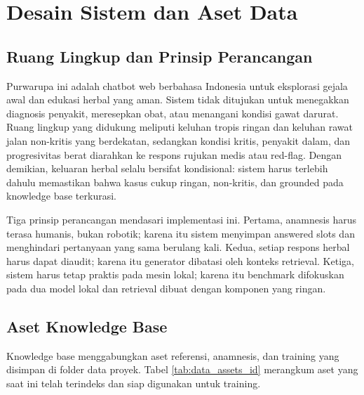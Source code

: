 \documentclass[conference]{IEEEtran}
\begin{document}
\section{Desain Sistem dan Aset Data}
\subsection{Ruang Lingkup dan Prinsip Perancangan}
Purwarupa ini adalah chatbot web berbahasa Indonesia untuk eksplorasi gejala awal dan edukasi herbal yang aman. Sistem tidak ditujukan untuk menegakkan diagnosis penyakit, meresepkan obat, atau menangani kondisi gawat darurat. Ruang lingkup yang didukung meliputi keluhan tropis ringan dan keluhan rawat jalan non-kritis yang berdekatan, sedangkan kondisi kritis, penyakit dalam, dan progresivitas berat diarahkan ke respons rujukan medis atau red-flag. Dengan demikian, keluaran herbal selalu bersifat kondisional: sistem harus terlebih dahulu memastikan bahwa kasus cukup ringan, non-kritis, dan grounded pada knowledge base terkurasi.

Tiga prinsip perancangan mendasari implementasi ini. Pertama, anamnesis harus terasa humanis, bukan robotik; karena itu sistem menyimpan answered slots dan menghindari pertanyaan yang sama berulang kali. Kedua, setiap respons herbal harus dapat diaudit; karena itu generator dibatasi oleh konteks retrieval. Ketiga, sistem harus tetap praktis pada mesin lokal; karena itu benchmark difokuskan pada dua model lokal dan retrieval dibuat dengan komponen yang ringan.

\subsection{Aset Knowledge Base}
Knowledge base menggabungkan aset referensi, anamnesis, dan training yang disimpan di folder data proyek. Tabel \ref{tab:data_assets_id} merangkum aset yang saat ini telah terindeks dan siap digunakan untuk training.
\end{document}
